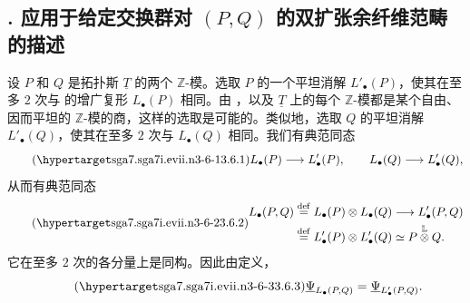 



\subsection*{. 应用于给定交换群对 $(P,Q)$ 的双扩张余纤维范畴的描述}

设 $P$ 和 $Q$ 是拓扑斯 $\underline T$ 的两个 $\mathbb Z$-模。选取 $P$ 的一个平坦消解 $L'_\bullet(P)$，使其在至多 $2$ 次与  的增广复形 $L_\bullet(P)$ 相同。由 ，以及 $\underline T$ 上的每个 $\mathbb Z$-模都是某个自由、因而平坦的 $\mathbb Z$-模的商，这样的选取是可能的。类似地，选取 $Q$ 的平坦消解 $L'_\bullet(Q)$，使其在至多 $2$ 次与 $L_\bullet(Q)$ 相同。我们有典范同态
\begin{equation}\tag{\SGARefTarget{sga7.sga7i.evii.n3-6-1}{3.6.1}}
 L_\bullet(P)\longrightarrow L'_\bullet(P),
 \qquad
 L_\bullet(Q)\longrightarrow L'_\bullet(Q),
\end{equation}
从而有典范同态
\begin{equation}\tag{\SGARefTarget{sga7.sga7i.evii.n3-6-2}{3.6.2}}
\begin{split}
 L_\bullet(P,Q)
 &\overset{\mathrm{def}}{=}L_\bullet(P)\otimes L_\bullet(Q)
 \longrightarrow L'_\bullet(P,Q)\\
 &\overset{\mathrm{def}}{=}L'_\bullet(P)\otimes L'_\bullet(Q)
 \simeq P\mathbin{\overset{\mathbb L}{\otimes}}Q.
\end{split}
\end{equation}
它在至多 $2$ 次的各分量上是同构。因此由定义，
\begin{equation}\tag{\SGARefTarget{sga7.sga7i.evii.n3-6-3}{3.6.3}}
 \underline\Psi_{L_\bullet(P,Q)}
 =
 \underline\Psi_{L'_\bullet(P,Q)}.
\end{equation}


